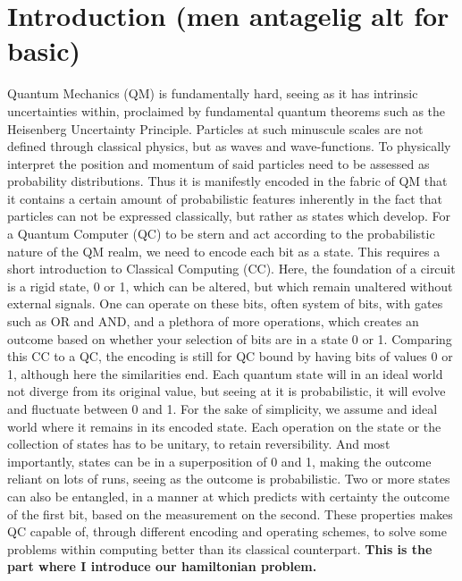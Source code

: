 \section{Introduction (men antagelig alt for basic)}
Quantum Mechanics (QM) is fundamentally hard, seeing as it has intrinsic uncertainties within, proclaimed by fundamental quantum theorems such as the Heisenberg Uncertainty Principle. Particles at such minuscule scales are not defined through classical physics, but as waves and wave-functions. To physically interpret the position and momentum of said particles need to be assessed as probability distributions. Thus it is manifestly encoded in the fabric of QM that it contains a certain amount of probabilistic features inherently in the fact that particles can not be expressed classically, but rather as states which develop. 
\newline\newline
For a Quantum Computer (QC) to be stern and act according to the probabilistic nature of the QM realm, we need to encode each bit as a state. This requires a short introduction to Classical Computing (CC). Here, the foundation of a circuit is a rigid state, 0 or 1, which can be altered, but which remain unaltered without external signals. One can operate on these bits, often system of bits, with gates such as OR and AND, and a plethora of more operations, which creates an outcome based on whether your selection of bits are in a state 0 or 1. 
\newline\newline
Comparing this CC to a QC, the encoding is still for QC bound by having bits of values 0 or 1, although here the similarities end. Each quantum state will in an ideal world not diverge from its original value, but seeing at it is probabilistic, it will evolve and fluctuate between 0 and 1. For the sake of simplicity, we assume and ideal world where it remains in its encoded state. Each operation on the state or the collection of states has to be unitary, to retain reversibility. And most importantly, states can be in a superposition of 0 and 1, making the outcome reliant on lots of runs, seeing as the outcome is probabilistic. Two or more states can also be entangled, in a manner at which predicts with certainty the outcome of the first bit, based on the measurement on the second. These properties makes QC capable of, through different encoding and operating schemes, to solve some problems within computing better than its classical counterpart. 
\newline\newline
\textbf{This is the part where I introduce our hamiltonian problem.}
